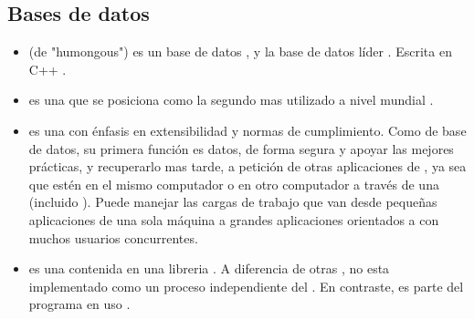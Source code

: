 \subsection{Bases de datos}
\begin{itemize}
	\item \textbf{\mongodb} (de "humongous") es un base de datos \documentoriented \opensource, y la base de datos líder \nosql. Escrita en C++ \cite{technology_mongodb}.
	
	\item \textbf{\mysql} es una \rdbms \opensource que se posiciona como la  segundo mas utilizado a nivel mundial \cite{online_db_engines_ranking}\cite{online_dispelling_myths} .
	
	\item \textbf{\postgresql} es una \ordbms con énfasis en extensibilidad y normas de cumplimiento. Como \server de base de datos, su primera función es \store datos, de forma segura y apoyar las mejores prácticas, y recuperarlo mas tarde, a petición de otras aplicaciones de \software, ya sea que estén \running en el mismo computador o \running en otro computador a través  de una \network (incluido \internet). Puede manejar las cargas de trabajo que van desde pequeñas aplicaciones de una sola máquina a grandes aplicaciones orientados a \internet con muchos usuarios concurrentes.
	
	\item \textbf{\sqlite} es una \rdbms contenida en una libreria \cprogramming. A diferencia de otras \dbmangesystem, \sqlite no esta implementado como un proceso independiente del \client. En contraste, es parte del programa en uso \cite{online_video_introduction_sqlite}.
\end{itemize}


